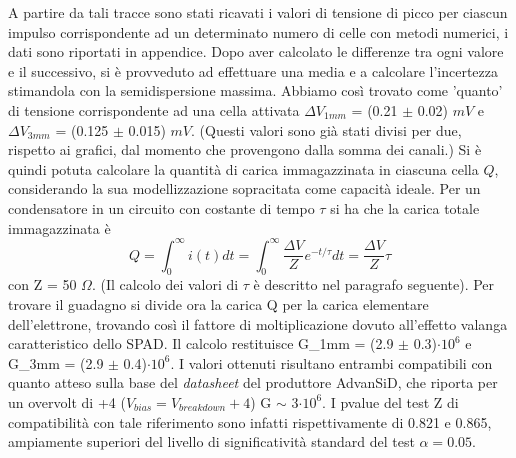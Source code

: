 \documentclass[journal]{IEEEtran}
\begin{document}
A partire da tali tracce sono stati ricavati i valori di tensione di picco per ciascun impulso corrispondente ad un determinato numero di celle con metodi numerici, i dati sono riportati in appendice. Dopo aver calcolato le differenze tra ogni valore e il successivo, si è provveduto ad effettuare una media e a calcolare l'incertezza stimandola con la semidispersione massima. Abbiamo così trovato come 'quanto' di tensione corrispondente ad una cella attivata $\Delta V_{1mm}$ = (0.21 $\pm$ 0.02) $mV$ e  $\Delta V_{3mm}$ = (0.125 $\pm$ 0.015) $mV$. (Questi valori sono già stati divisi per due, rispetto ai grafici, dal momento che provengono dalla somma dei canali.) Si è quindi potuta calcolare la quantità di carica immagazzinata in ciascuna cella $Q$, considerando la sua modellizzazione sopracitata come capacità ideale. Per un condensatore in un circuito con costante di tempo $\tau$ si ha che la carica totale immagazzinata è
\begin{equation}
    Q = \int_{0}^{\infty} i(t) dt = \int_{0}^{\infty} \frac{\Delta V}{Z} e^{-t/ \tau}  dt = \frac{\Delta V}{Z} \tau
\end{equation}
con Z = 50 $\Omega$. (Il calcolo dei valori di $\tau$ è descritto nel paragrafo seguente). Per trovare il guadagno si divide ora la carica Q per la carica elementare dell'elettrone, trovando così il fattore di moltiplicazione dovuto all'effetto valanga caratteristico dello SPAD. Il calcolo restituisce G_{1mm} = (2.9 $\pm$ 0.3)$\cdot 10^6$ e G_{3mm} = (2.9 $\pm$ 0.4)$\cdot 10^6$. I valori ottenuti risultano entrambi compatibili con quanto atteso sulla base del \textit{datasheet} del produttore AdvanSiD, che riporta per un overvolt di +4 ($V_{bias} = V_{breakdown} + 4$) G $\sim$ 3$\cdot10^6$. I pvalue del test Z di compatibilità con tale riferimento sono infatti rispettivamente di 0.821 e 0.865, ampiamente superiori del livello di significatività standard del test $\alpha = 0.05$.
\end{document}

